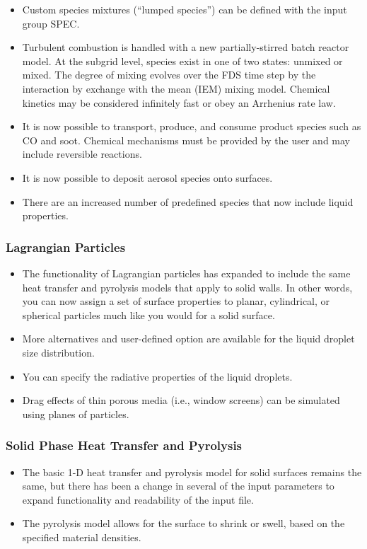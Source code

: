 \documentclass[11pt]{book}
\begin{document}
    \begin{itemize}
    \item Custom species mixtures (``lumped species'') can be defined with the input group SPEC.
    \item Turbulent combustion is handled with a new partially-stirred batch reactor model. At the subgrid level, species exist in one of two states: unmixed or mixed. The degree of mixing evolves over the FDS time step by the interaction by exchange with the mean (IEM) mixing model. Chemical kinetics may be considered infinitely fast or obey an Arrhenius rate law.
    \item It is now possible to transport, produce, and consume product species such as CO and soot. Chemical mechanisms must be provided by the user and may include reversible reactions.
    \item It is now possible to deposit aerosol species onto surfaces.
    \item There are an increased number of predefined species that now include liquid properties.
    \end{itemize}

\subsubsection{Lagrangian Particles}

    \begin{itemize}
    \item The functionality of Lagrangian particles has expanded to include the same heat transfer and pyrolysis models that apply to solid walls. In other words, you can now assign a set of surface properties to planar, cylindrical, or spherical particles much like you would for a solid surface.
    \item More alternatives and user-defined option are available for the liquid droplet size distribution.
    \item You can specify the radiative properties of the liquid droplets.
    \item Drag effects of thin porous media (i.e., window screens) can be simulated using planes of particles.
    \end{itemize}

\subsubsection{Solid Phase Heat Transfer and Pyrolysis}

    \begin{itemize}
    \item The basic 1-D heat transfer and pyrolysis model for solid surfaces remains the same, but there has been a change in several of the input parameters to expand functionality and readability of the input file.
    \item The pyrolysis model allows for the surface to shrink or swell, based on the specified material densities.
    \end{itemize}
\end{document}
